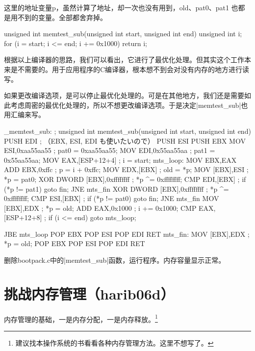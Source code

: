 这里的地址变量p，虽然计算了地址，却一次也没有用到，old、pat0、pat1 也都是用不到的变量。全部都舍弃掉。

\begin{code}
 unsigned int memtest_sub(unsigned int start, unsigned int end)
  {
      unsigned int i;
      for (i = start; i <= end; i += 0x1000) { }
      return i;
  }
\end{code}

根据以上编译器的思路，我们可以看出，它进行了最优化处理。但其实这个工作本来是不需要的。用于应用程序的C编译器，根本想不到会对没有内存的地方进行读写。

如果更改编译选项，是可以停止最优化处理的。可是在其他地方，我们还是需要如此考虑周密的最优化处理的，所以不想更改编译选项。于是决定|memtest_sub|也用汇编来写。

\begin{code}[label=naskfunc.nas节选]
_memtest_sub:   ; unsigned int memtest_sub(unsigned int start, unsigned int end)
		PUSH	EDI						; （EBX, ESI, EDI も使いたいので）
        PUSH    ESI
        PUSH    EBX
        MOV     ESI,0xaa55aa55          ; pat0 = 0xaa55aa55;
        MOV     EDI,0x55aa55aa          ; pat1 = 0x55aa55aa;
        MOV     EAX,[ESP+12+4]          ; i = start;
mts_loop:
        MOV     EBX,EAX
        ADD     EBX,0xffc               ; p = i + 0xffc;
        MOV     EDX,[EBX]               ; old = *p;
        MOV     [EBX],ESI               ; *p = pat0;
        XOR     DWORD [EBX],0xffffffff  ; *p ^= 0xffffffff;
        CMP     EDI,[EBX]               ; if (*p != pat1) goto fin;
        JNE     mts_fin
        XOR     DWORD [EBX],0xffffffff  ; *p ^= 0xffffffff;
        CMP     ESI,[EBX]               ; if (*p != pat0) goto fin;
        JNE     mts_fin
        MOV     [EBX],EDX               ; *p = old;
        ADD     EAX,0x1000              ; i += 0x1000;
        CMP     EAX,[ESP+12+8]          ; if (i <= end) goto mts_loop;

       JBE     mts_loop
        POP     EBX
        POP     ESI
        POP     EDI
        RET
mts_fin:
        MOV     [EBX],EDX               ; *p = old;
        POP     EBX
        POP     ESI
        POP     EDI
        RET
\end{code}

删除bootpack.c中的|memtest_sub|函数，运行程序。内存容量显示正常。
\section{	挑战内存管理（harib06d）	}
内存管理的基础，一是内存分配，一是内存释放。\footnote{建议找本操作系统的书看看各种内存管理方法。这里不想写了。}

